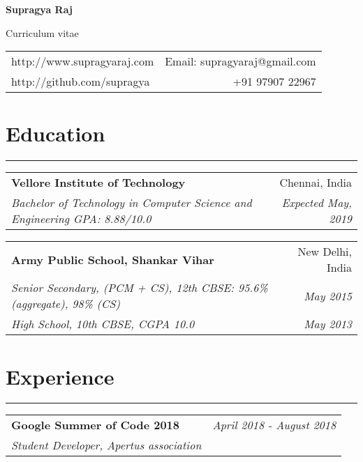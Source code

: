 \documentclass[9pt, a4paper]{article}
\begin{document}
\begin{center}
\Large \textbf{Supragya Raj}


\normalsize Curriculum vitae


\end{center}
\begin{tabularx}{\textwidth}{X r}
	http://www.supragyaraj.com & Email: supragyaraj@gmail.com \\
	http://github.com/supragya & +91 97907 22967 
\end{tabularx}
\newline


\section*{Education}
\vspace{-8px}
\hrule
\vspace{4px}
\hspace{5px}
\begin{tabularx}{\textwidth}{X r}
	\textbf{Vellore Institute of Technology} & Chennai, India \\
	\textit{\small Bachelor of Technology in Computer Science and Engineering GPA: 8.88/10.0} & \textit{Expected May, 2019} 
\end{tabularx}

\hspace{5px}
\begin{tabularx}{\textwidth}{X r}
	\textbf{Army Public School, Shankar Vihar} & New Delhi, India \\
	\textit{\small Senior Secondary, (PCM + CS), 12th CBSE:  95.6\% (aggregate), 98\% (CS)} & \textit{May 2015} \\
	\textit{\small High School, 10th CBSE, CGPA 10.0} & \textit{May 2013}
\end{tabularx}


\section*{Experience}
\vspace{-8px}
\hrule

\vspace{4px}
\hspace{5px}
\begin{tabularx}{\textwidth}{X r}
	\textbf{Google Summer of Code 2018} & \textit{April 2018 - August 2018} \\
	\textit{\small Student Developer, Apertus association} & \\
\end{tabularx}
\end{document}
